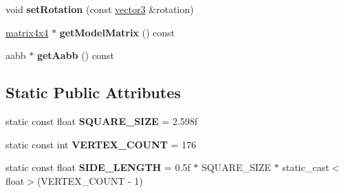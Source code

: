 \begin{DoxyCompactItemize}
\mbox{\label{classflounder_1_1terrain_a537b1e31e290e85f7e11a7a9fd8da994}} 
void {\bfseries set\+Rotation} (const \hyperlink{classflounder_1_1vector3}{vector3} \&rotation)
\item 
\mbox{\label{classflounder_1_1terrain_a6fa95c667785744a4c7241bc2b8f5c47}} 
\hyperlink{classflounder_1_1matrix4x4}{matrix4x4} $\ast$ {\bfseries get\+Model\+Matrix} () const
\item 
\mbox{\label{classflounder_1_1terrain_a7039ff6cd4c77df3c50b01714a4daac0}} 
aabb $\ast$ {\bfseries get\+Aabb} () const
\end{DoxyCompactItemize}
\subsection*{Static Public Attributes}
\begin{DoxyCompactItemize}
\item 
\mbox{\label{classflounder_1_1terrain_a8f36adc3c6aa6eda5afba8503c123745}} 
static const float {\bfseries S\+Q\+U\+A\+R\+E\+\_\+\+S\+I\+ZE} = 2.\+598f
\item 
\mbox{\label{classflounder_1_1terrain_a70c92fdfb820daaecc89b5658df6bd88}} 
static const int {\bfseries V\+E\+R\+T\+E\+X\+\_\+\+C\+O\+U\+NT} = 176
\item 
\mbox{\label{classflounder_1_1terrain_ab97fd295dde189ade356877f7eaccb5f}} 
static const float {\bfseries S\+I\+D\+E\+\_\+\+L\+E\+N\+G\+TH} = 0.\+5f $\ast$ S\+Q\+U\+A\+R\+E\+\_\+\+S\+I\+Z\+E $\ast$ static\+\_\+cast$<$float$>$(\+V\+E\+R\+T\+E\+X\+\_\+\+C\+O\+U\+N\+T -\/ 1)
\end{DoxyCompactItemize}
